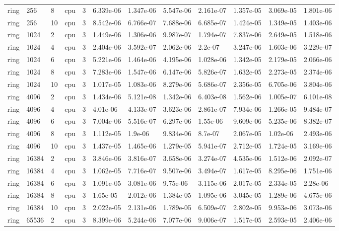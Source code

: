 \begin{tabular}{llllllllllll}
ring & 256 & 8 & cpu & 3 & 6.339e-06 & 1.347e-06 & 5.547e-06 & 2.161e-07 & 1.357e-05 & 3.069e-05 & 1.801e-06 \\
ring & 256 & 10 & cpu & 3 & 8.542e-06 & 6.766e-07 & 7.688e-06 & 6.685e-07 & 1.424e-05 & 1.349e-05 & 1.403e-06 \\
ring & 1024 & 2 & cpu & 3 & 1.449e-06 & 1.306e-06 & 9.987e-07 & 1.794e-07 & 7.837e-06 & 2.649e-05 & 1.518e-06 \\
ring & 1024 & 4 & cpu & 3 & 2.404e-06 & 3.592e-07 & 2.062e-06 & 2.2e-07 & 3.247e-06 & 1.603e-06 & 3.229e-07 \\
ring & 1024 & 6 & cpu & 3 & 5.221e-06 & 1.464e-06 & 4.195e-06 & 1.028e-06 & 1.342e-05 & 2.179e-05 & 2.066e-06 \\
ring & 1024 & 8 & cpu & 3 & 7.283e-06 & 1.547e-06 & 6.147e-06 & 5.826e-07 & 1.632e-05 & 2.273e-05 & 2.374e-06 \\
ring & 1024 & 10 & cpu & 3 & 1.017e-05 & 1.083e-06 & 8.279e-06 & 5.686e-07 & 2.356e-05 & 6.705e-06 & 3.804e-06 \\
ring & 4096 & 2 & cpu & 3 & 1.434e-06 & 5.121e-08 & 1.342e-06 & 6.403e-08 & 1.562e-06 & 1.005e-07 & 6.101e-08 \\
ring & 4096 & 4 & cpu & 3 & 4.01e-06 & 4.133e-07 & 3.623e-06 & 2.861e-07 & 7.934e-06 & 1.266e-05 & 9.484e-07 \\
ring & 4096 & 6 & cpu & 3 & 7.004e-06 & 5.516e-07 & 6.297e-06 & 1.55e-06 & 9.609e-06 & 5.235e-06 & 8.382e-07 \\
ring & 4096 & 8 & cpu & 3 & 1.112e-05 & 1.9e-06 & 9.834e-06 & 8.7e-07 & 2.067e-05 & 1.02e-06 & 2.493e-06 \\
ring & 4096 & 10 & cpu & 3 & 1.437e-05 & 1.465e-06 & 1.279e-05 & 5.941e-07 & 2.712e-05 & 1.724e-05 & 3.169e-06 \\
ring & 16384 & 2 & cpu & 3 & 3.846e-06 & 3.816e-07 & 3.658e-06 & 3.274e-07 & 4.535e-06 & 1.512e-06 & 2.092e-07 \\
ring & 16384 & 4 & cpu & 3 & 1.062e-05 & 7.716e-07 & 9.507e-06 & 3.494e-07 & 1.617e-05 & 8.295e-06 & 1.751e-06 \\
ring & 16384 & 6 & cpu & 3 & 1.091e-05 & 3.081e-06 & 9.75e-06 & 3.115e-06 & 2.017e-05 & 2.334e-05 & 2.28e-06 \\
ring & 16384 & 8 & cpu & 3 & 1.65e-05 & 2.012e-06 & 1.384e-05 & 1.095e-06 & 3.045e-05 & 1.289e-06 & 4.675e-06 \\
ring & 16384 & 10 & cpu & 3 & 2.022e-05 & 2.131e-06 & 1.789e-05 & 6.509e-07 & 2.802e-05 & 9.953e-06 & 3.073e-06 \\
ring & 65536 & 2 & cpu & 3 & 8.399e-06 & 5.244e-06 & 7.077e-06 & 9.006e-07 & 1.517e-05 & 2.593e-05 & 2.406e-06 \\

\end{tabular}
